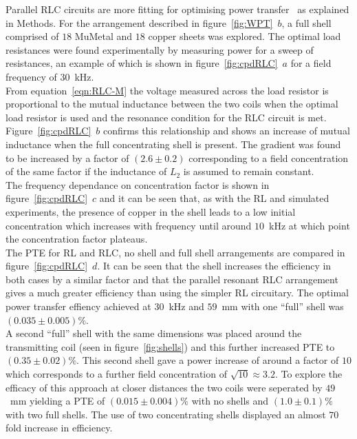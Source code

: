 \documentclass[11pt]{iopart}
\begin{document}
Parallel RLC circuits are more fitting for optimising power
transfer~\cite{XXX} as explained in Methods. For the arrangement
described in figure~\ref{fig:WPT}~$b$, a full shell comprised of $18$
MuMetal and $18$ copper sheets was explored. The optimal load
resistances were found experimentally by measuring power for a sweep
of resistances, an example of which is shown in
figure~\ref{fig:cpdRLC}~$a$ for a field frequency of $30$~kHz.\\
From equation~\ref{eqn:RLC-M} the voltage measured across the load
resistor is proportional to the mutual inductance between the two
coils when the optimal load resistor is used and the resonance
condition for the RLC circuit is met. Figure~\ref{fig:cpdRLC}~$b$
confirms this relationship and shows an increase of mutual inductance
when the full concentrating shell is present. The gradient was found
to be increased by a factor of $(2.6 \pm 0.2)$ corresponding to a field
concentration of the same factor if the inductance of $L_2$ is assumed
to remain constant. \\
The frequency dependance on concentration factor is shown in
figure~\ref{fig:cpdRLC}~$c$ and it can be seen that, as with the RL and
simulated experiments, the presence of copper in the shell leads to a
low initial concentration which increases with frequency until around
$10$~kHz at which point the concentration factor plateaus.\\
The PTE for RL and RLC, no shell and full shell arrangements are
compared in figure~\ref{fig:cpdRLC}~$d$. It can be seen that the shell
increases the efficiency in both cases by a similar factor and that
the parallel resonant RLC arrangement gives a much greater efficiency
than using the simpler RL circuitary. The optimal power transfer
effiency achieved at $30$~kHz and $59$~mm with one ``full'' shell was
$(0.035\pm0.005)\%$. \\ A second ``full'' shell with the same
dimensions was placed around the transmitting coil (seen in figure~\ref{fig:shells}) and this further
increased PTE to $(0.35\pm0.02)\%$. This second shell gave a power
increase of around a factor of $10$ which corresponds to a further
field concentration of $\sqrt{10} \approx 3.2$. To explore the
efficacy of this approach at closer distances the two coils were
seperated by $49$~mm yielding a PTE of $(0.015\pm0.004)\%$ with no
shells and $(1.0\pm0.1)\%$ with two full shells. The use of two
concentrating shells displayed an almost $70$ fold increase in
efficiency.
\end{document}
